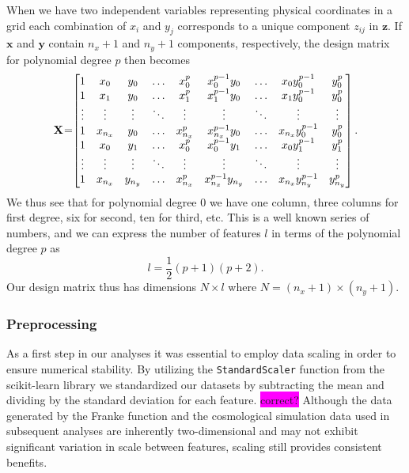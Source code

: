 \documentclass[aps,pra,english,notitlepage,reprint,nofootinbib]{revtex4-1}  %
\begin{document}
When we have two independent variables representing physical coordinates in a grid each combination of $x_i$ and $y_j$ corresponds to a unique component $z_{ij}$ in $\mathbf{z}$. If $\mathbf{x}$ and $\mathbf{y}$ contain $n_x+1$ and $n_y+1$ components, respectively, the design matrix for polynomial degree $p$ then becomes
\begin{equation*}
  \mathbf{X} \hspace{-2pt}=\hspace{-3pt}\begin{bmatrix}
    1 & x_0 & y_0 & \ldots&x_0^p & x_0^{p-1}y_0 &\ldots& x_0y_0^{p-1}&y_0^p
    \\
    1 & x_1 & y_0 & \ldots & x_1^p & x_1^{p-1}y_0 &\ldots& x_1y_0^{p-1}&y_0^p
    \\
    \vdots&\vdots&\vdots&\ddots&\vdots&\vdots&\ddots&\vdots&\vdots
    \\
    1 & x_{n_x} & y_{0} & \ldots&x_{n_x}^p & x_{n_x}^{p-1}y_0 &\ldots& x_{n_x}y_0^{p-1}&y_0^p
    \\
    1 & x_0 & y_1 & \ldots& x_0^p & x_0^{p-1}y_1 &\ldots& x_0y_1^{p-1}&y_1^p
    \\
    \vdots&\vdots&\vdots&\ddots&\vdots&\vdots&\ddots&\vdots&\vdots
    \\
    1 & x_{n_x} & y_{n_y} & \ldots& x_{n_x}^p & x_{n_x}^{p-1}y_{n_y} &\ldots& x_{n_x}y_{n_y}^{p-1}&y_{n_y}^p
  \end{bmatrix}.
\end{equation*}
We thus see that for polynomial degree 0 we have one column, three columns for first degree, six for second, ten for third, etc. This is a well known series of numbers, and we can express the number of features $l$ in terms of the polynomial degree $p$ as
\begin{equation*}
  l = \frac{1}{2}(p+1)(p+2).
\end{equation*}
Our design matrix thus has dimensions $N\times l$ where $N=(n_x+1)\times(n_y+1)$.


\subsubsection{Preprocessing}
As a first step in our analyses it was essential to employ data scaling in order to ensure numerical stability. By utilizing the \verb|StandardScaler| function from the scikit-learn library \cite{scikit-learn} we standardized our datasets by subtracting the mean and dividing by the standard deviation for each feature. \colorbox{magenta}{correct?} Although the data generated by the Franke function and the cosmological simulation data used in subsequent analyses are inherently two-dimensional and may not exhibit significant variation in scale between features, scaling still provides consistent benefits.
\end{document}
